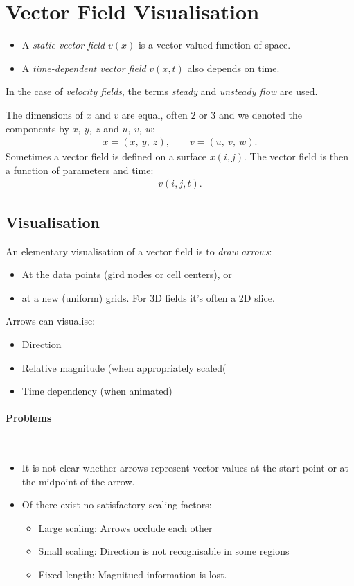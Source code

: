 \section{Vector Field Visualisation}
\begin{itemize}
\item A \emph{static vector field} $v(x)$ is a vector-valued function of space.
\item A \emph{time-dependent vector field} $v(x,t)$ also depends on time.
\end{itemize}
In the case of \emph{velocity fields}, the terms \emph{steady} and \emph{unsteady flow} are used. 

The dimensions of $ x$ and $ v$ are equal, often $2$ or $3$ and we denoted the components by $x,\ y,\ z$ and $u,\ v,\ w$:
    \begin{align*}
         x = (x,\ y,\ z),\qquad v =(u,\ v,\ w).
    \end{align*}
Sometimes a vector field is defined on a surface $x(i,j)$. The vector field is then a function of parameters and time:
    \begin{align*}
        v(i,j,t).
    \end{align*}

\subsection{Visualisation}
An elementary visualisation of a vector field is to \emph{draw arrows}:
\begin{itemize}
    \item At the data points (gird nodes or cell centers), or
    \item at a new (uniform) grids. For 3D fields it's often a 2D slice.
\end{itemize}

Arrows can visualise:
\begin{itemize}
    \item Direction
    \item Relative magnitude (when appropriately scaled(
    \item Time dependency (when animated)
\end{itemize}

\paragraph{Problems} $\ $
\begin{itemize}
    \item It is not clear whether arrows represent vector values at the start point or at the midpoint of the arrow.
    \item Of there exist no satisfactory scaling factors:
        \begin{itemize}
            \item Large scaling: Arrows occlude each other
            \item Small scaling: Direction is not recognisable in some regions
            \item Fixed length: Magnitued information is lost.
        \end{itemize}
\end{itemize}

